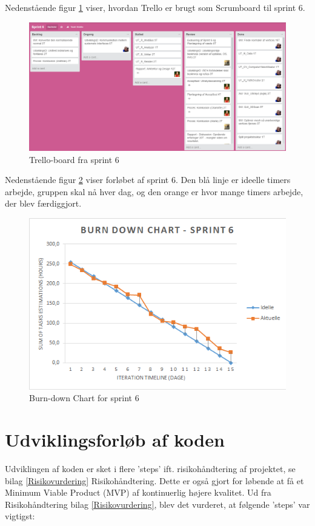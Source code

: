 Nedenstående figur \ref{Trello} viser, hvordan Trello er brugt som Scrumboard til sprint 6. 

\begin{figure}[H]
    \centering
    \includegraphics[width=1\textwidth]{figurer/d/Trello}
    \caption{Trello-board fra sprint 6}
    \label{Trello}
\end{figure}

Nedenstående figur \ref{Burn} viser forløbet af sprint 6. Den blå linje er ideelle timers arbejde, gruppen skal nå hver dag, og den orange er hvor mange timers arbejde, der blev færdiggjort. 

\begin{figure}[H]
    \centering
    \includegraphics[width=1\textwidth]{figurer/d/Burn-down}
    \caption{Burn-down Chart for sprint 6}
    \label{Burn}
\end{figure}

\newpage

\section{Udviklingsforløb af koden}
Udviklingen af koden er sket i flere 'steps' ift. risikohåndtering af projektet, se bilag \ref{Risikovurdering} Risikohåndtering. Dette er også gjort for løbende at få et Minimum Viable Product (MVP) af kontinuerlig højere kvalitet. 
Ud fra Risikohåndtering bilag \ref{Risikovurdering}, blev det vurderet, at følgende 'steps' var vigtigst:

